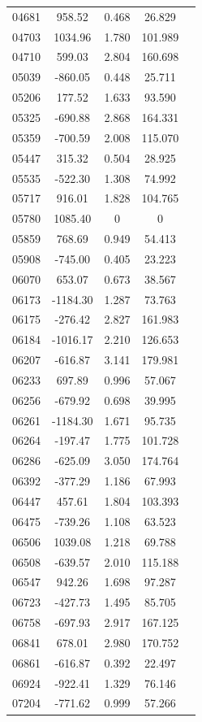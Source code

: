{\begin{longtable}{ccccc}
04681 & 958.52 & 0.468 & 26.829\\
04703 & 1034.96 & 1.780 & 101.989\\
04710 & 599.03 & 2.804 & 160.698\\
05039 & -860.05 & 0.448 & 25.711\\
05206 & 177.52 & 1.633 & 93.590\\
05325 & -690.88 & 2.868 & 164.331\\
05359 & -700.59 & 2.008 & 115.070\\
05447 & 315.32 & 0.504 & 28.925\\
05535 & -522.30 & 1.308 & 74.992\\
05717 & 916.01 & 1.828 & 104.765\\
05780 & 1085.40 & 0 & 0\\
05859 & 768.69 & 0.949 & 54.413\\
05908 & -745.00 & 0.405 & 23.223\\
06070 & 653.07 & 0.673 & 38.567\\
06173 & -1184.30 & 1.287 & 73.763\\
06175 & -276.42 & 2.827 & 161.983\\
06184 & -1016.17 & 2.210 & 126.653\\
06207 & -616.87 & 3.141 & 179.981\\
06233 & 697.89 & 0.996 & 57.067\\
06256 & -679.92 & 0.698 & 39.995\\
06261 & -1184.30 & 1.671 & 95.735\\
06264 & -197.47 & 1.775 & 101.728\\
06286 & -625.09 & 3.050 & 174.764\\
06392 & -377.29 & 1.186 & 67.993\\
06447 & 457.61 & 1.804 & 103.393\\
06475 & -739.26 & 1.108 & 63.523\\
06506 & 1039.08 & 1.218 & 69.788\\
06508 & -639.57 & 2.010 & 115.188\\
06547 & 942.26 & 1.698 & 97.287\\
06723 & -427.73 & 1.495 & 85.705\\
06758 & -697.93 & 2.917 & 167.125\\
06841 & 678.01 & 2.980 & 170.752\\
06861 & -616.87 & 0.392 & 22.497\\
06924 & -922.41 & 1.329 & 76.146\\
07204 & -771.62 & 0.999 & 57.266\\

\end{longtable}}
